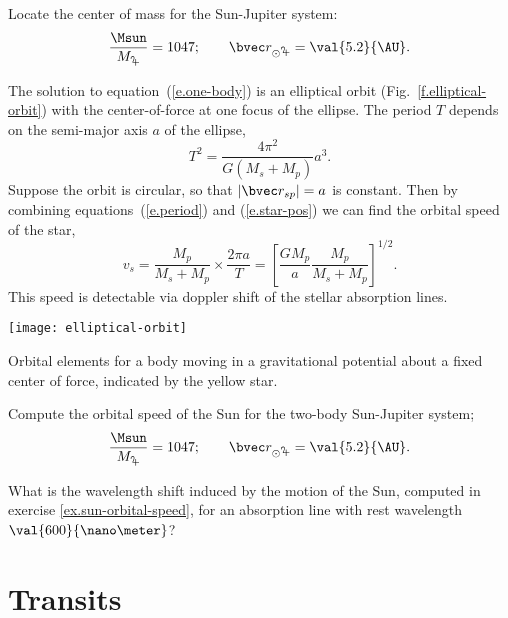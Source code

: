 \begin{exercisebox}
Locate the center of mass for the Sun-Jupiter system:
\[ \frac{\Msun}{M_{\mathrm{\jupiter}}} = 1047; \qquad \rv_{\mathrm{\odot\jupiter}} = \val{5.2}{\AU}. \]
\end{exercisebox}

The solution to equation~(\ref{e.one-body}) is an elliptical orbit (Fig.~\ref{f.elliptical-orbit}) with the center-of-force at one focus of the ellipse.  The period $T$ depends on the semi-major axis $a$ of the ellipse,
\begin{equation}\label{e.period}
	T^{2} = \frac{4\pi^{2}}{G(M_{s}+M_{p})} a^{3}.
\end{equation}
Suppose the orbit is circular, so that $|\rv_{sp}|=a$ is constant.  Then by combining equations~(\ref{e.period}) and (\ref{e.star-pos}) we can find the orbital speed of the star,
\begin{equation}\label{e.star-velocity}
	v_{s} = \frac{M_{p}}{M_{s}+M_{p}} \times \frac{2\pi a}{T} = \left[\frac{GM_{p}}{a}
	\frac{M_{p}}{M_{s}+M_{p}}\right]^{1/2}.
\end{equation}
This speed is detectable via doppler shift of the stellar absorption lines.

\begin{marginfigure}
\texttt{[image: elliptical-orbit]}
\caption[Orbital elements]{Orbital elements for a body moving in a gravitational potential about a fixed center of force, indicated by the yellow star.}
\label{f.elliptical-orbit}
\end{marginfigure}

\begin{exercisebox}
\label{ex.sun-orbital-speed}
	Compute the orbital speed of the Sun for the two-body Sun-Jupiter system;
\[ \frac{\Msun}{M_{\mathrm{\jupiter}}} = 1047; \qquad \rv_{\mathrm{\odot\jupiter}} = \val{5.2}{\AU}. \]
\end{exercisebox}

\begin{exercisebox}
	What is the wavelength shift induced by the motion of the Sun, computed in exercise \ref{ex.sun-orbital-speed}, for an absorption line with rest wavelength $\val{600}{\nano\meter}$?
\end{exercisebox}

\section{Transits}

